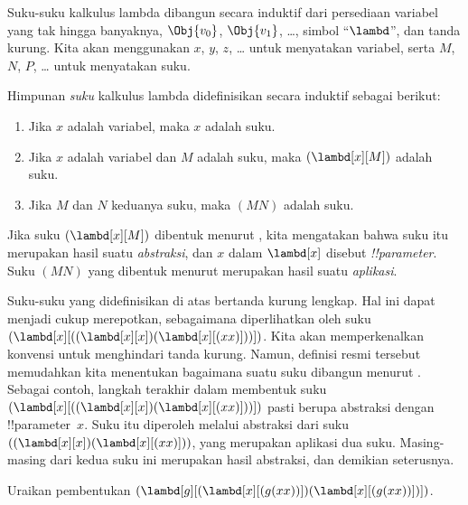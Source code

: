 \documentclass[../../../include/open-logic-section]{subfiles}
\begin{document}

Suku-suku kalkulus lambda dibangun secara induktif dari persediaan variabel
yang tak hingga banyaknya, $\Obj{v_0}$, $\Obj{v_1}$, \dots, simbol
``$\lambd$'', dan tanda kurung. Kita akan menggunakan $x$, $y$, $z$, \dots{}
untuk menyatakan variabel, serta $M$, $N$, $P$, \dots{} untuk menyatakan suku.

\begin{defn}[Suku] 
Himpunan \emph{suku} kalkulus lambda didefinisikan secara induktif sebagai
berikut:
\begin{enumerate}
  \item {} Jika $x$ adalah variabel, maka $x$ adalah
    suku.
  \item {} Jika $x$ adalah variabel dan $M$ adalah
    suku, maka $(\lambd[x][M])$ adalah suku.
  \item {} Jika $M$ dan $N$ keduanya suku, maka
    $(MN)$ adalah suku.
\end{enumerate}
\end{defn}

Jika suku $(\lambd[x][M])$ dibentuk menurut
, kita mengatakan bahwa suku itu merupakan hasil suatu
\emph{abstraksi}, dan $x$ dalam $\lambd[x]$ disebut
\emph{!!{parameter}}. Suku $(MN)$ yang dibentuk menurut
 merupakan hasil suatu \emph{aplikasi}.

Suku-suku yang didefinisikan di atas bertanda kurung lengkap. Hal ini dapat
menjadi cukup merepotkan, sebagaimana diperlihatkan oleh suku
$(\lambd[x][((\lambd[x][x])(\lambd[x][(xx)]))])$. Kita akan memperkenalkan
konvensi untuk menghindari tanda kurung. Namun, definisi resmi tersebut
memudahkan kita menentukan bagaimana suatu suku dibangun menurut
. Sebagai contoh, langkah terakhir dalam membentuk suku
$(\lambd[x][((\lambd[x][x])(\lambd[x][(xx)]))])$ pasti berupa abstraksi
dengan !!{parameter}~$x$. Suku itu diperoleh melalui abstraksi dari suku
$((\lambd[x][x])(\lambd[x][(xx)]))$, yang merupakan aplikasi dua suku.
Masing-masing dari kedua suku ini merupakan hasil abstraksi, dan demikian
seterusnya.

\begin{prob}
Uraikan pembentukan $(\lambd[g][(\lambd[x][(g (x x))])
  (\lambd[x][(g (x x))])])$.
\end{prob}
\end{document}
